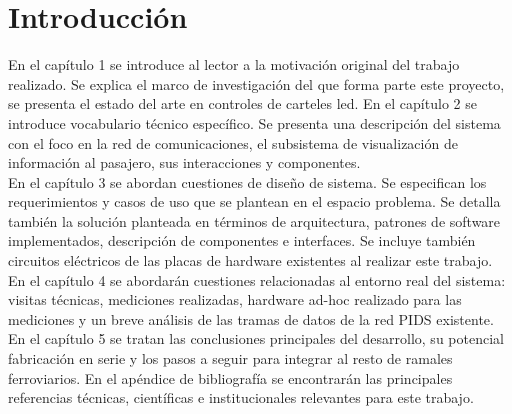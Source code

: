 
\chapter{Introducción} %
En el capítulo 1 se introduce al lector a la motivación original del trabajo realizado. Se explica el marco de investigación del que forma parte este proyecto, se presenta el estado del arte en controles de carteles led.
En el capítulo 2 se introduce vocabulario técnico específico. Se presenta una descripción del sistema con el foco en la red de comunicaciones, el subsistema de visualización de información al pasajero, sus interacciones y componentes.\\


En el capítulo 3 se abordan cuestiones de diseño de sistema. Se especifican los requerimientos y casos de uso que se plantean en el espacio problema. Se detalla también la solución planteada en términos de arquitectura, patrones de software implementados, descripción de componentes e interfaces. Se incluye también circuitos eléctricos de las placas de hardware existentes al realizar este trabajo.\\


En el capítulo 4 se abordarán cuestiones relacionadas al entorno real del sistema: visitas técnicas, mediciones realizadas, hardware ad-hoc realizado para las mediciones y un breve análisis de las tramas de datos de la red PIDS existente.\\


En el capítulo 5 se tratan las conclusiones principales del desarrollo, su potencial fabricación en serie y los pasos a seguir para integrar al resto de ramales ferroviarios. En el apéndice de bibliografía se encontrarán las principales referencias técnicas, científicas e institucionales relevantes para este trabajo.\\


\label{Chapter1} %
\label{Intro}




\newcommand{\keyword}[1]{\textbf{#1}}
\newcommand{\tabhead}[1]{\textbf{#1}}
\newcommand{\code}[1]{\texttt{#1}}
\newcommand{\file}[1]{\texttt{\bfseries#1}}
\newcommand{\option}[1]{\texttt{\itshape#1}}
\newcommand{\grados}{$^{\circ}$}

